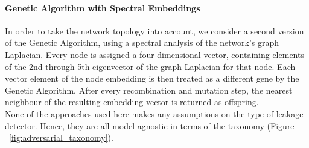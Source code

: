 \paragraph*{Genetic Algorithm with Spectral Embeddings}
In order to take the network topology into account, we consider a second
version of the Genetic Algorithm, using a spectral analysis of the network's
graph Laplacian. Every node is assigned a four dimensional vector, containing
elements of the 2nd through 5th eigenvector of the graph Laplacian for that
node. Each vector element of the node embedding is then treated as a
different gene by the Genetic Algorithm. After every recombination and
mutation step, the nearest neighbour of the resulting embedding vector is
returned as offspring.\\

None of the approaches used here makes any assumptions on the type of leakage
detector. Hence, they are all model-agnostic in terms of the taxonomy (Figure
~\ref{fig:adversarial_taxonomy}).
